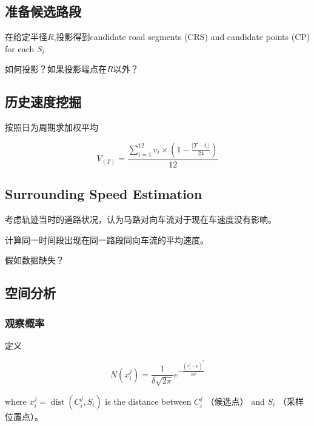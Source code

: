 \subsection{准备候选路段}

在给定半径$R$,投影得到candidate road segments (CRS) and candidate points (CP) for each $S_i$

\begin{remark}
    如何投影？如果投影端点在$R$以外？
\end{remark}

\subsection{历史速度挖掘}

按照日为周期求加权平均

\begin{equation} V_{(T)}=\frac{\sum_{i=1}^{12} v_{i} \times\left(1-\frac{\left|T-t_{i}\right|}{24}\right)}{12} \end{equation}

\subsection{Surrounding Speed Estimation}

考虑轨迹当时的道路状况，认为马路对向车流对于现在车速度没有影响。

计算同一时间段出现在同一路段同向车流的平均速度。

\begin{remark}
    假如数据缺失？
\end{remark}

\subsection{空间分析}

\subsubsection{观察概率}

定义

\begin{equation} N\left(x_{i}^{j}\right)=\frac{1}{\delta \sqrt{2 \pi}} e^{-\frac{\left(x_{i}^{j}-\mu\right)^{2}}{2 \delta^{2}}} \end{equation}

where $ x_{i}^{j}=\operatorname{dist}\left(C_{i}^{j}, S_{i}\right) $ is the distance between $ C_{i}^{j} $ （候选点） and $ S_{i} $ （采样位置点）。

